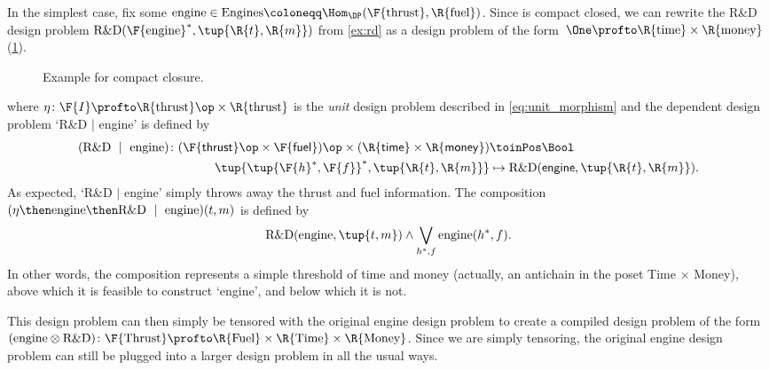 \begin{example}
  \label{ex:rdproblem}
  In the simplest case, fix some $\text{engine} \in \text{Engines} \coloneqq \Hom_\DP(\F{\text{thrust}},\R{\text{fuel}})$. Since \DP is compact closed, we can rewrite the R\&D design problem $\text{R\&D}(\F{\text{engine}}^*, \tup{\R{t},\R{m}})$ from \cref{ex:rd} as a design problem of the form~$\One \profto \R{\text{time}} \times\R{\text{money}}$ (\cref{fig:excompactclosed}).
  \begin{figure}[h!]
    \begin{center}
    \end{center}
    \caption{Example for compact closure. \label{fig:excompactclosed}}
  \end{figure}
  where $\eta \colon \F{I} \profto \R{\text{thrust}}\op \times \R{\text{thrust}}$ is the \emph{unit} design problem described in \cref{eq:unit_morphism} and the dependent design problem `R\&D $\mid$ engine' is defined by
  \begin{equation}
    \begin{aligned}
    (\text{R\&D } \mid \text{ engine})
      \colon (\F{\mathsf{thrust}}\op \times \F{\mathsf{fuel}})\op \times (\R{\mathsf{time}} \times \R{\mathsf{money}}) &\toinPos \Bool \\
      \tup{\tup{\F{h}^*, \F{f}}^*, \tup{\R{t},\R{m}}} &\mapsto \text{R\&D}(\mathsf{engine}, \tup{\R{t},\R{m}}).
    \end{aligned}
  \end{equation}
  As expected, `R\&D $|$ engine' simply throws away the thrust and fuel information. The composition $(\eta \then \text{engine} \then \text{R\&D } \mid \text{ engine}) (t,m)$ is defined by
  \begin{equation}
    \text{R\&D}(\text{engine}, \tup{t,m}) \wedge \bigvee_{h^*,f} \text{engine}(h^*, f).
  \end{equation}
  In other words, the composition represents a simple threshold of time and money (actually, an antichain in the poset Time $\times$ Money), above which it is feasible to construct `engine', and below which it is not.

  This design problem can then simply be tensored with the original engine design problem to create a compiled design problem of the form $(\text{engine} \otimes \text{R\&D}) \colon \F{\text{Thrust}} \profto \R{\text{Fuel}} \times \R{\text{Time}} \times \R{\text{Money}}$. Since we are simply tensoring, the original engine design problem can still be plugged into a larger design problem in all the usual ways.
\end{example}

